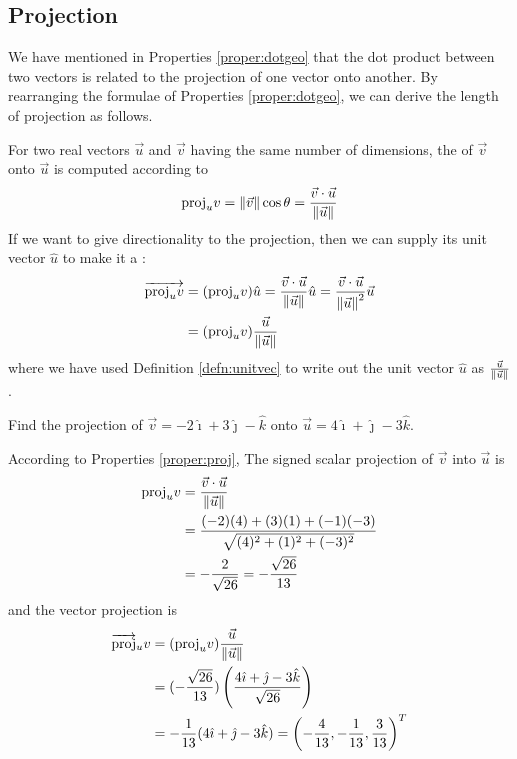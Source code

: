 \subsection{Projection}
\label{section:proj}
We have mentioned in Properties \ref{proper:dotgeo} that the dot product between two vectors is related to the projection of one vector onto another. By rearranging the formulae of Properties \ref{proper:dotgeo}, we can derive the length of projection as follows.
\begin{proper}
\label{proper:proj}
For two real vectors $\vec{u}$ and $\vec{v}$ having the same number of dimensions, the  of $\vec{v}$ onto $\vec{u}$ is computed according to
\begin{align}
\text{proj}_u v = \norm{\vec{v}} \cos\theta = \frac{\vec{v} \cdot \vec{u}}{\norm{\vec{u}}}  \label{eqn:scalarproj}
\end{align}
If we want to give directionality to the projection, then we can supply its unit vector $\hat{u}$ to make it a :
\begin{subequations}
\begin{align}
\overrightarrow{\text{proj}_u v} &= (\text{proj}_u v) \hat{u} = \frac{\vec{v} \cdot \vec{u}} {\norm{\vec{u}}} \hat{u} = \frac{\vec{v} \cdot \vec{u}}{\norm{\vec{u}}^2} \vec{u} \\
&= (\text{proj}_u v) \frac{\vec{u}}{\norm{\vec{u}}}
\end{align}    
\end{subequations}
where we have used Definition \ref{defn:unitvec} to write out the unit vector $\hat{u}$ as $\frac{\vec{u}}{\norm{\vec{u}}}$.
\end{proper}

\begin{exmp}
\label{exmp:projectuv}
Find the projection of $\vec{v} = -2\hat{\imath} + 3\hat{\jmath} - \hat{k}$ onto $\vec{u} = 4\hat{\imath} + \hat{\jmath} - 3\hat{k}$.
\end{exmp}
\begin{solution}
According to Properties \ref{proper:proj}, The signed scalar projection of $\vec{v}$ into $\vec{u}$ is
\begin{align*}
\text{proj}_u v &= \frac{\vec{v} \cdot \vec{u}}{\norm{\vec{u}}}  \\
&= \frac{(-2)(4)+(3)(1)+(-1)(-3)}{\sqrt{(4)^2+(1)^2+(-3)^2}} \\
&= -\frac{2}{\sqrt{26}} = -\frac{\sqrt{26}}{13}
\end{align*}
and the vector projection is 
\begin{align*}
\overrightarrow{\text{proj}}_u v &= (\text{proj}_u v) \frac{\vec{u}}{\norm{\vec{u}}} \\
&= (-\frac{\sqrt{26}}{13}) \left(\frac{4\hat{\imath} + \hat{\jmath} - 3\hat{k}}{\sqrt{26}}\right) \\
&= -\frac{1}{13} (4\hat{\imath} + \hat{\jmath} - 3\hat{k}) = \left(-\frac{4}{13}, -\frac{1}{13}, \frac{3}{13}\right)^T
\end{align*}   
\end{solution}

